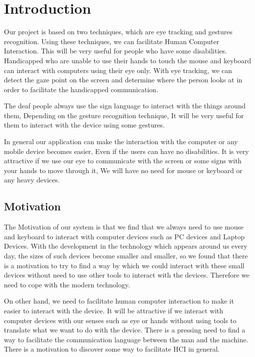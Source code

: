 \chapter{Introduction}
Our project is based on two techniques, which are eye tracking and gestures recognition. Using these techniques, we can facilitate Human Computer Interaction. This will be very useful for people who have some disabilities. Handicapped who are unable to use their hands to touch the mouse and keyboard can interact with computers using their eye only. With eye tracking, we can detect the gaze point on the screen and determine where the person looks at in order to facilitate the handicapped communication.

The deaf people always use the sign language to interact with the things around them, Depending on the gesture recognition technique, It will be very useful for them to interact with the device using some gestures.

In general our application can make the interaction with the computer or any mobile device becomes easier, Even if the users can have no disabilities. It is very attractive if we use our eye to communicate with the screen or some signs with your hands to move through it, We will have no need for mouse or keyboard or any heavy devices.

\section{Motivation} 
The Motivation of our system is that we find that we always need to use mouse and keyboard to interact with computer devices such as PC devices and Laptop Devices. With the development in the technology which appears around us every day, the sizes of such devices become smaller and smaller, so we found that there is a motivation to try to find a way by which we could interact with these small devices without need to use other tools to interact with the devices. Therefore we need to cope with the modern technology. \bigskip

On other hand, we need to facilitate human computer interaction to make it easier to interact with the device. It will be attractive if we interact with computer devices with our senses such as eye or hands without using tools to translate what we want to do with the device. There is a pressing need to find a way to facilitate the communication language between the man and the machine. There is a motivation to discover some way to facilitate HCI in general. \bigskip

